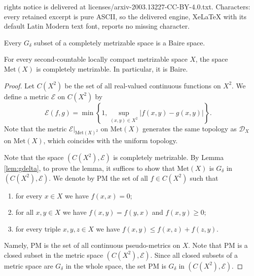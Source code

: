 \documentclass[10pt,a4paper]{amsart}
\newcommand{\metdis}{\mathcal{D}}
\newcommand{\met}[1]{\mathrm{Met}(#1)}
\newcommand{\yopset}{\mathrm{PM}}
\begin{document}
rights notice is delivered at licenses/arxiv-2003.13227-CC-BY-4.0.txt. Characters: every retained excerpt is pure ASCII, so the delivered engine, XeLaTeX with its default Latin Modern text font, reports no missing character.
\begin{lem}\label{lem:gdelta}
Every 
$G_{\delta}$ 
subset of a completely metrizable space is a Baire space. 
\end{lem}

\begin{lem}\label{lem:Baire}
For 
every  second-countable  locally compact metrizable space 
$X$, 
the space 
$\met{X}$
 is  completely metrizable. 
 In particular,  it is Baire. 
\end{lem}

\begin{proof}
Let 
$C(X^{2})$ 
be the set of all real-valued continuous functions on $X^{2}$.
We define a metric 
$\mathcal{E}$ 
on
 $C(X^{2})$ 
by 
\begin{equation*}\label{eq:E}
\mathcal{E}(f, g)=\min\left\{1,\sup_{(x, y)\in X^{2}}|f(x, y)-g(x, y)|\right\}. 
\end{equation*}
Note that
the metric 
$\mathcal{E}|_{\met{X}^{2}}$ 
on 
$\met{X}$  
generates the same topology as  
$\metdis_{X}$ 
on 
$\met{X}$, 
which coincides  with the uniform topology.  




Note that  the space 
$(C(X^{2}), \mathcal{E})$ 
is completely metrizable. 
By Lemma 
\ref{lem:gdelta}, 
to prove the lemma, 
it suffices to show that 
$\met{X}$ 
is 
$G_{\delta}$ 
in  
$(C(X^{2}), \mathcal{E})$.
We denote by
 $\yopset$ 
 the set of all 
$f\in C(X^{2})$ 
such that 
\begin{enumerate}
	
	\item for every 
	$x\in X$ 
	we have 
	$f(x, x)=0$;
	
	\item 
	for all
	 $x, y\in X$ 
	 we have 
	 $f(x, y)=f(y, x)$
	 and 
	 $f(x, y)\ge 0$;
	 
	\item for every triple 
	$x, y, z\in X$
	 we have  $
	 f(x, y)\le f(x, z)+f(z, y)$. 
\end{enumerate}
Namely, 
$\yopset$ 
is the set of all 
continuous pseudo-metrics on 
$X$. 
Note that 
$\yopset$ 
is 
a closed subset in  the metric space 
$(C(X^{2}), \mathcal{E})$. 
Since all closed subsets 
of a metric space are 
$G_{\delta}$ 
in the whole space, 
the set 
$\yopset$ 
is 
$G_{\delta}$ 
in 
$(C(X^{2}), \mathcal{E})$. 



\end{proof}
\end{document}
